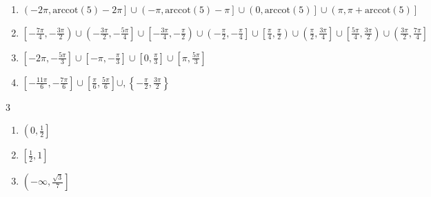 \documentclass{ximera}
\begin{document}
\begin{enumerate}

\setcounter{enumi}{\value{HW}}

\item  $\left(-2\pi, \text{arccot}(5) - 2\pi\right] \cup \left(-\pi, \text{arccot}(5) - \pi\right] \cup \left(0, \text{arccot}(5)\right] \cup \left(\pi, \pi + \text{arccot}(5)\right]$

\item \scriptsize $\left[ -\frac{7\pi}{4}, -\frac{3\pi}{2} \right) \cup \left( -\frac{3\pi}{2}, -\frac{5\pi}{4} \right] \cup \left[ -\frac{3\pi}{4}, -\frac{\pi}{2} \right) \cup \left( -\frac{\pi}{2}, -\frac{\pi}{4} \right] \cup \left[ \frac{\pi}{4}, \frac{\pi}{2} \right) \cup \left( \frac{\pi}{2}, \frac{3\pi}{4} \right] \cup \left[ \frac{5\pi}{4}, \frac{3\pi}{2} \right) \cup \left( \frac{3\pi}{2}, \frac{7\pi}{4} \right]$ \normalsize

\item $\left[ -2\pi, -\frac{5\pi}{3} \right] \cup \left[ -\pi, -\frac{\pi}{3} \right] \cup \left[ 0, \frac{\pi}{3} \right] \cup \left[ \pi, \frac{5\pi}{3} \right]$

\item $\left[ -\frac{11\pi}{6},  -\frac{7\pi}{6} \right] \cup \left[ \frac{\pi}{6}, \frac{5\pi}{6} \right] \cup, \left\{ -\frac{\pi}{2}, \frac{3\pi}{2} \right\}$

\setcounter{HW}{\value{enumi}}

\end{enumerate}


\begin{multicols}{3}

\begin{enumerate}

\setcounter{enumi}{\value{HW}}

\item $\left(0, \frac{1}{2}\right]$ \vphantom{$\left(-\infty, \frac{\sqrt{3}}{7} \right]$}
\item $\left[\frac{1}{2}, 1\right]$ \vphantom{$\left(-\infty, \frac{\sqrt{3}}{7} \right]$}
\item $\left(-\infty, \frac{\sqrt{3}}{7} \right]$

\setcounter{HW}{\value{enumi}}

\end{enumerate}

\end{multicols}
\end{document}
